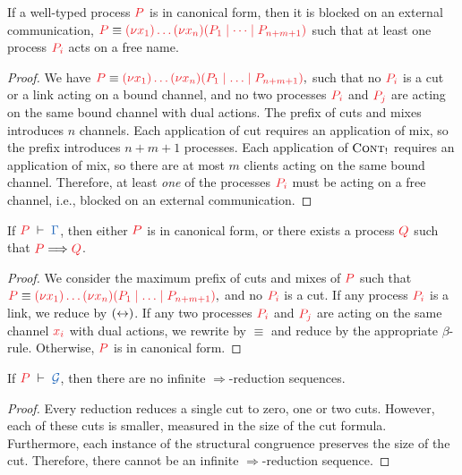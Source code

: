 \documentclass[envcountsame,envcountsect,UKenglish]{llncs}
\begin{document}
\begin{lemma}
  If a well-typed process $\tm{P}$ is in canonical form, then it is blocked on
  an external communication, \ie
  $\tm{P}\equiv\tm{\piNew{x_1}{\dots\piNew{x_n}{(P_1\mid\dots\mid P_{n+m+1})}}}$
  such that at least one process $\tm{P_i}$ acts on a free name.
\end{lemma}
\begin{proof}
  We have
  \(
  \tm{P} \equiv \tm{\piNew{x_1}{\dots\piNew{x_n}{(P_1 \ppar \dots \ppar P_{n+m+1})}}},
  \)
  such that no $\tm{P_i}$ is a cut or a link acting on a bound channel, and no two processes $\tm{P_i}$ and $\tm{P_j}$ are acting on the same bound channel with dual actions. The prefix of cuts and mixes introduces $n$ channels. Each application of cut requires an application of mix, so the prefix introduces $n+m+1$ processes. Each application of $\textsc{Cont}_{!}$ requires an application of mix, so there are at most $m$ clients acting on the same bound channel. Therefore, at least \emph{one} of the processes $\tm{P_i}$ must be acting on a free channel, i.e., blocked on an external communication.
\end{proof}
\begin{theorem}[Progress]\label{thm:nodcap-progress}
  If $\seq[P]{\Gamma}$, then either $\tm{P}$ is in canonical form, or there exists a process $\tm{Q}$ such that $\tm{P}\Longrightarrow\tm{Q}$.
\end{theorem} 
\begin{proof}
  We consider the maximum prefix of cuts and mixes of $\tm{P}$ such that
  \(
  \tm{P} \equiv \tm{\piNew{x_1}{\dots\piNew{x_n}{(P_1 \ppar \dots \ppar P_{n+m+1})}}},
  \)
  and no $\tm{P_i}$ is a cut. If any process $\tm{P_i}$ is a link, we reduce by $({\leftrightarrow})$. If any two processes $\tm{P_i}$ and $\tm{P_j}$ are acting on the same channel $\tm{x_i}$ with dual actions, we rewrite by $\equiv$ and reduce by the appropriate $\beta$-rule. Otherwise, $\tm{P}$ is in canonical form.
\end{proof}
\begin{theorem}[Termination]\label{thm:nodcap-termination}
  If $\seq[P]{\mathcal{G}}$, then there are no infinite $\Longrightarrow$-reduction sequences.
\end{theorem} 
\begin{proof}
  Every reduction reduces a single cut to zero, one or two cuts. However, each of these cuts is smaller, measured in the size of the cut formula. Furthermore, each instance of the structural congruence preserves the size of the cut. Therefore, there cannot be an infinite $\Longrightarrow$-reduction sequence.
\end{proof}
\end{document}
